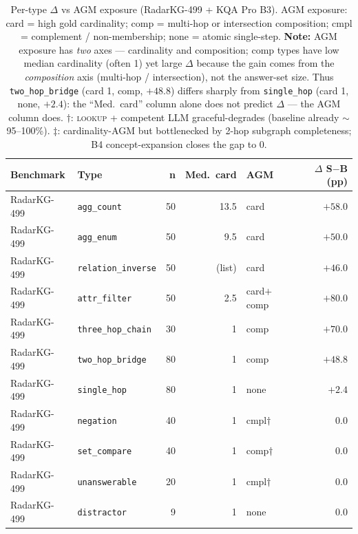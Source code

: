 \documentclass[11pt,a4paper]{article}
\newcommand{\qtype}[1]{\texttt{\small #1}}
\newcommand{\op}[1]{\textsc{\small #1}}
\begin{document}
\begin{table}[t]
\centering
\small
\caption{Per-type $\Delta$ vs AGM exposure (RadarKG-499 + KQA Pro B3). AGM exposure: \textsf{card} = high gold cardinality; \textsf{comp} = multi-hop or intersection composition; \textsf{cmpl} = complement / non-membership; \textsf{none} = atomic single-step. \textbf{Note:} AGM exposure has \emph{two} axes --- cardinality and composition; \textsf{comp} types have low median cardinality (often 1) yet large $\Delta$ because the gain comes from the \emph{composition} axis (multi-hop / intersection), not the answer-set size. Thus \qtype{two\_hop\_bridge} (card 1, \textsf{comp}, $+48.8$) differs sharply from \qtype{single\_hop} (card 1, \textsf{none}, $+2.4$): the ``Med.\ card'' column alone does not predict $\Delta$ --- the AGM column does. $\dagger$: \op{lookup} + competent LLM graceful-degrades (baseline already $\sim$95--100\%). $\ddagger$: cardinality-AGM but bottlenecked by 2-hop subgraph completeness; B4 concept-expansion closes the gap to 0.}
\label{tab:agm}
\setlength{\tabcolsep}{5pt}
\begin{tabular}{l l r r l r}
\toprule
\textbf{Benchmark} & \textbf{Type} & \textbf{n} & \textbf{Med.\ card} & \textbf{AGM} & \textbf{$\Delta$ S$-$B (pp)} \\
\midrule
RadarKG-499 & \qtype{agg\_count}        & 50 & 13.5 & card       & $\mathbf{+58.0}$ \\
RadarKG-499 & \qtype{agg\_enum}         & 50 &  9.5 & card       & $\mathbf{+50.0}$ \\
RadarKG-499 & \qtype{relation\_inverse} & 50 & (list) & card     & $\mathbf{+46.0}$ \\
RadarKG-499 & \qtype{attr\_filter}      & 50 &  2.5 & card$+$comp & $\mathbf{+80.0}$ \\
RadarKG-499 & \qtype{three\_hop\_chain} & 30 &   1  & comp       & $\mathbf{+70.0}$ \\
RadarKG-499 & \qtype{two\_hop\_bridge}  & 80 &   1  & comp       & $\mathbf{+48.8}$ \\
RadarKG-499 & \qtype{single\_hop}       & 80 &   1  & none       & $+2.4$ \\
RadarKG-499 & \qtype{negation}          & 40 &   1  & cmpl$\dagger$ & $0.0$ \\
RadarKG-499 & \qtype{set\_compare}      & 40 &   1  & comp$\dagger$ & $0.0$ \\
RadarKG-499 & \qtype{unanswerable}      & 20 &   1  & cmpl$\dagger$ & $0.0$ \\
RadarKG-499 & \qtype{distractor}        &  9 &   1  & none       & $0.0$ \\

\end{tabular}
\end{table}
\end{document}
